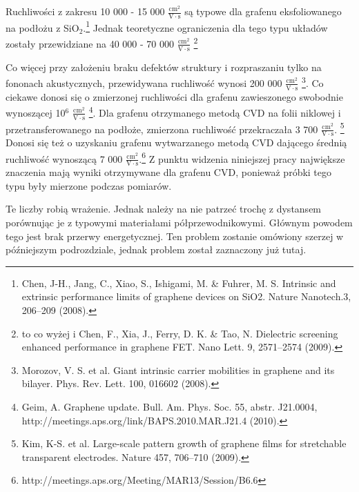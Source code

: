 	Ruchliwości z zakresu 10 000 - 15 000  $\mathrm{\frac{cm^2}{V\cdot s}}$ są typowe dla grafenu eksfoliowanego
	na podłożu z SiO$_2$.\footnote{Chen, J-H., Jang, C., Xiao, S., Ishigami, M. \& Fuhrer, M. S. Intrinsic and
extrinsic performance limits of graphene devices on SiO2. Nature Nanotech.3, 206–209 (2008).}
Jednak teoretyczne ograniczenia dla tego typu układów zostały przewidziane na 40 000 - 70 000  
	 $\mathrm{\frac{cm^2}{V\cdot s}}$ \footnote{to co wyżej i Chen, F., Xia, J., Ferry, D. K. \& Tao, N. Dielectric screening enhanced
performance in graphene FET. Nano Lett. 9, 2571–2574 (2009).}

	Co więcej przy założeniu braku defektów struktury i rozpraszaniu tylko na fononach akustycznych, przewidywana
	ruchliwość wynosi 200 000 $\mathrm{\frac{cm^2}{V\cdot s}}$ \footnote{Morozov, V. S. et al. Giant intrinsic carrier mobilities in graphene and its bilayer.
Phys. Rev. Lett. 100, 016602 (2008).}. Co ciekawe donosi się o zmierzonej ruchliwości dla grafenu zawieszonego swobodnie
	wynoszącej 10$^6$ $\mathrm{\frac{cm^2}{V\cdot s}}$ \footnote{Geim, A. Graphene update. Bull. Am. Phys. Soc. 55, abstr. J21.0004,
http://meetings.aps.org/link/BAPS.2010.MAR.J21.4 (2010).}. 
	Dla grafenu otrzymanego metodą CVD na folii niklowej i przetransferowanego na podłoże, zmierzona ruchliwość 
	przekraczała 3 700 $\mathrm{\frac{cm^2}{V\cdot s}}$. \footnote{Kim, K-S. et al. Large-scale pattern growth of graphene films for stretchable
transparent electrodes. Nature 457, 706–710 (2009).} Donosi się też o uzyskaniu grafenu wytwarzanego metodą CVD
	dającego średnią ruchliwość wynoszącą 7 000 $\mathrm{\frac{cm^2}{V\cdot s}}$.\footnote{http://meetings.aps.org/Meeting/MAR13/Session/B6.6}
	Z punktu widzenia niniejszej pracy największe znaczenia mają wyniki otrzymywane dla grafenu CVD, ponieważ próbki
	tego typu były mierzone podczas pomiarów.
	
	Te liczby robią wrażenie. Jednak należy na nie patrzeć trochę z dystansem porównując je z typowymi materiałami
	półprzewodnikowymi. Głównym powodem tego jest brak przerwy energetycznej. Ten problem zostanie omówiony szerzej
	w późniejszym podrozdziale, jednak problem został zaznaczony już tutaj.


